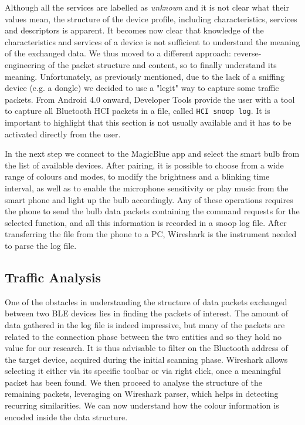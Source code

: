 Although all the services are labelled as \textit{unknown} and it is not clear what their values mean, the structure of the device profile, including characteristics, services and descriptors is apparent.
It becomes now clear that knowledge of the characteristics and services of a device is not sufficient to understand the meaning of the exchanged data. We thus moved to a different approach: reverse-engineering of the packet structure and content, so to finally understand its meaning. Unfortunately, as previously mentioned, due to the lack of a sniffing device (e.g. a dongle) we decided to use a "legit" way to capture some traffic packets. From Android 4.0 onward, Developer Tools provide the user with a tool to capture all Bluetooth HCI packets in a file, called \texttt{HCI snoop log}. It is important to highlight that this section is not usually available and it has to be activated directly from the user.

In the next step we connect to the MagicBlue app and select the smart bulb from the list of available devices. After pairing, it is possible to choose from a wide range of colours and modes, to modify the brightness and a blinking time interval, as well as to enable the microphone sensitivity or play music from the smart phone and light up the bulb accordingly. Any of these operations requires the phone to send the bulb data packets containing the command requests for the selected function, and all this information is recorded in a snoop log file.
After transferring the file from the phone to a PC, Wireshark is the instrument needed to parse the log file.

\subsection {Traffic Analysis}
One of the obstacles in understanding the structure of data packets exchanged between two BLE devices lies in finding the packets of interest. The amount of data gathered in the log file is indeed impressive, but many of the packets are related to the connection phase between the two entities and so they hold no value for our research.
It is thus advisable to filter on the Bluetooth address of the target device, acquired during the initial scanning phase. Wireshark allows selecting it either via its specific toolbar or via right click, once a meaningful packet has been found. We then proceed to analyse the structure of the remaining packets, leveraging on Wireshark parser, which helps in detecting recurring similarities. We can now understand how the colour information is encoded inside the data structure.

